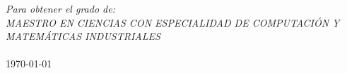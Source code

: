 \documentclass[
10pt, %
spanish, %
onehalfspacing,%
headsepline, %
]{MastersDoctoralThesis} %
\begin{document}
\begin{titlepage}
\begin{center}
 
\large \textit{Para obtener el grado de:}\\[0.3cm] %
\textit{MAESTRO EN CIENCIAS CON ESPECIALIDAD DE COMPUTACI\'ON Y MATEM\'ATICAS INDUSTRIALES}\\[0.4cm]
\deptname\\[2cm] %
 
{\large \today}\\[4cm] %
 
\vfill
\end{center}
\end{titlepage}


\end{document}
